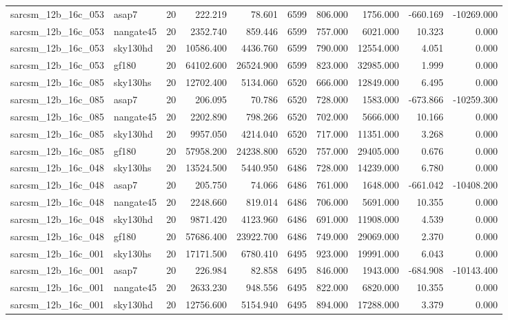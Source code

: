 \documentclass{article}
\begin{document}
\begin{longtable}{llrrrrrrrr}
sarcsm\_12b\_16c\_053 & asap7 & 20 & 222.219 & 78.601 & 6599 & 806.000 & 1756.000 & -660.169 & -10269.000 \\
sarcsm\_12b\_16c\_053 & nangate45 & 20 & 2352.740 & 859.446 & 6599 & 757.000 & 6021.000 & 10.323 & 0.000 \\
sarcsm\_12b\_16c\_053 & sky130hd & 20 & 10586.400 & 4436.760 & 6599 & 790.000 & 12554.000 & 4.051 & 0.000 \\
sarcsm\_12b\_16c\_053 & gf180 & 20 & 64102.600 & 26524.900 & 6599 & 823.000 & 32985.000 & 1.999 & 0.000 \\
sarcsm\_12b\_16c\_085 & sky130hs & 20 & 12702.400 & 5134.060 & 6520 & 666.000 & 12849.000 & 6.495 & 0.000 \\
sarcsm\_12b\_16c\_085 & asap7 & 20 & 206.095 & 70.786 & 6520 & 728.000 & 1583.000 & -673.866 & -10259.300 \\
sarcsm\_12b\_16c\_085 & nangate45 & 20 & 2202.890 & 798.266 & 6520 & 702.000 & 5666.000 & 10.166 & 0.000 \\
sarcsm\_12b\_16c\_085 & sky130hd & 20 & 9957.050 & 4214.040 & 6520 & 717.000 & 11351.000 & 3.268 & 0.000 \\
sarcsm\_12b\_16c\_085 & gf180 & 20 & 57958.200 & 24238.800 & 6520 & 757.000 & 29405.000 & 0.676 & 0.000 \\
sarcsm\_12b\_16c\_048 & sky130hs & 20 & 13524.500 & 5440.950 & 6486 & 728.000 & 14239.000 & 6.780 & 0.000 \\
sarcsm\_12b\_16c\_048 & asap7 & 20 & 205.750 & 74.066 & 6486 & 761.000 & 1648.000 & -661.042 & -10408.200 \\
sarcsm\_12b\_16c\_048 & nangate45 & 20 & 2248.660 & 819.014 & 6486 & 706.000 & 5691.000 & 10.355 & 0.000 \\
sarcsm\_12b\_16c\_048 & sky130hd & 20 & 9871.420 & 4123.960 & 6486 & 691.000 & 11908.000 & 4.539 & 0.000 \\
sarcsm\_12b\_16c\_048 & gf180 & 20 & 57686.400 & 23922.700 & 6486 & 749.000 & 29069.000 & 2.370 & 0.000 \\
sarcsm\_12b\_16c\_001 & sky130hs & 20 & 17171.500 & 6780.410 & 6495 & 923.000 & 19991.000 & 6.043 & 0.000 \\
sarcsm\_12b\_16c\_001 & asap7 & 20 & 226.984 & 82.858 & 6495 & 846.000 & 1943.000 & -684.908 & -10143.400 \\
sarcsm\_12b\_16c\_001 & nangate45 & 20 & 2633.230 & 948.556 & 6495 & 822.000 & 6820.000 & 10.355 & 0.000 \\
sarcsm\_12b\_16c\_001 & sky130hd & 20 & 12756.600 & 5154.940 & 6495 & 894.000 & 17288.000 & 3.379 & 0.000 \\

\end{longtable}
\end{document}
